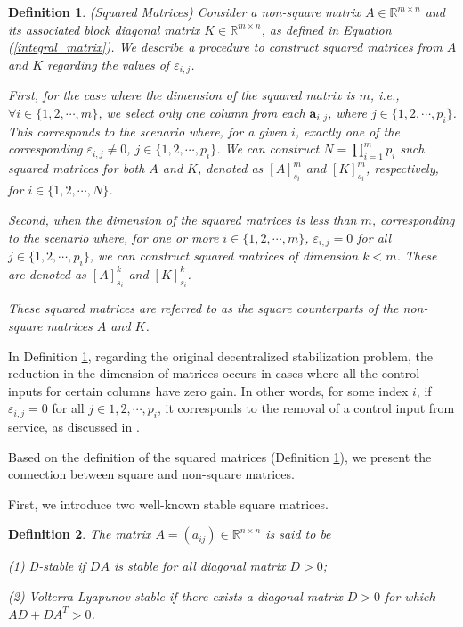 \documentclass{article}
\newtheorem{definition}{Definition}
\begin{document}
\begin{definition} (Squared Matrices) \label{squaredmatrix}
Consider a non-square matrix $A \in \mathbb{R}^{m \times n}$ and its associated block diagonal matrix $K \in \mathbb{R}^{m \times n}$, as defined in Equation (\ref{integral_matrix}). We describe a procedure to construct squared matrices from $A$ and $K$ regarding the values of $\varepsilon_{i,j}$.

First, for the case where the dimension of the squared matrix is $m$, i.e., $\forall i \in \{1, 2, \cdots, m\}$, we select only one column from each $\boldsymbol{a}_{i, j}$, where $j \in \{1, 2, \cdots, p_i\}$. This corresponds to the scenario where, for a given $i$, exactly one of the corresponding $\varepsilon_{i,j} \ne 0$, $j \in \{1, 2, \cdots, p_i\}$. We can construct $N = \prod_{i=1}^{m} p_i$ such squared matrices for both $A$ and $K$, denoted as $[A]^m_{s_i}$ and $[K]^m_{s_i}$, respectively, for $i \in \{1, 2, \cdots, N\}$.

Second, when the dimension of the squared matrices is less than $m$, corresponding to the scenario where, for one or more $i \in \{1, 2, \cdots, m\}$, $\varepsilon_{i,j} = 0$ for all $j \in \{1, 2, \cdots, p_i\}$, we can construct squared matrices of dimension $k < m$. These are denoted as $[A]^k_{s_i}$ and $[K]^k_{s_i}$.

These squared matrices are referred to as the square counterparts of the non-square matrices $A$ and $K$.
\end{definition}

In Definition \ref{squaredmatrix},  regarding the original decentralized stabilization problem, the reduction in the dimension of matrices occurs in cases where all the control inputs for certain columns have zero gain. In other words, for some index $i$, if $\varepsilon_{i,j} = 0$ for all $j \in {1, 2, \cdots, p_i}$, it corresponds to the removal of a control input from service, as discussed in \cite{campo1994achievable}.

Based on the definition of the squared matrices (Definition \ref{squaredmatrix}), we present the connection between square and non-square matrices. 

First, we introduce two well-known stable square matrices.

\begin{definition} \cite{Cross:-Thre}
The matrix $A=(a_{ij}) \in \mathbb{R}^{n \times n}$ is said to be

(1) D-stable if $DA$ is stable for all diagonal matrix $D>0$;

(2) Volterra-Lyapunov stable if there exists a diagonal matrix $D >0$ for which $AD + DA^T > 0$.
\end{definition}
\end{document}
